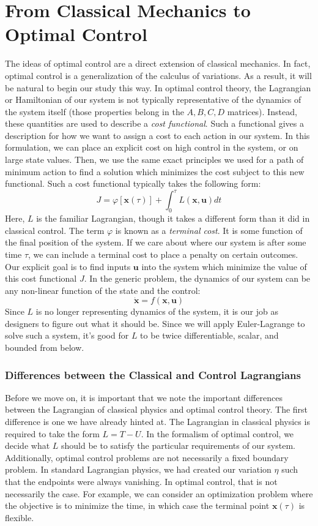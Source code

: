 \section{From Classical Mechanics to Optimal Control}
The ideas of optimal control are a direct extension of classical mechanics. In fact, optimal control is a generalization of the calculus of variations. As a result, it will be natural to begin our study this way. In optimal control theory, the \gls{Lagrangian} or \gls{Hamiltonian} of our system is not typically representative of the dynamics of the system itself (those properties belong in the $A,B,C,D$ matrices). Instead, these quantities are used to describe a \textit{cost functional}. Such a functional gives a description for how we want to assign a cost to each action in our system. In this formulation, we can place an explicit cost on high control in the system, or on large state values. Then, we use the same exact principles we used for a path of minimum action to find a solution which minimizes the cost subject to this new functional. Such a cost functional typically takes the following form:
$$J=\varphi[\bm{x}(\tau)]+\int_0^\tau L(\bm{x},\bm{u})dt$$
Here, $L$ is the familiar \gls{Lagrangian}, though it takes a different form than it did in classical control. The term $\varphi$ is known as a \textit{terminal cost}. It is some function of the final position of the system. If we care about where our system is after some time $\tau$, we can include a terminal cost to place a penalty on certain outcomes. Our explicit goal is to find inputs $\bm{u}$ into the system which minimize the value of this cost functional $J$. In the generic problem, the dynamics of our system can be any non-linear function of the state and the control:
$$\bm{\dot{x}}=f(\bm{x},\bm{u})$$
Since $L$ is no longer representing dynamics of the system, it is our job as designers to figure out what it should be. Since we will apply Euler-Lagrange to solve such a system, it's good for $L$ to be twice differentiable, scalar, and bounded from below.

\subsubsection{Differences between the Classical and Control Lagrangians}
Before we move on, it is important that we note the important differences between the \gls{Lagrangian} of classical physics and optimal control theory. The first difference is one we have already hinted at. The \gls{Lagrangian} in classical physics is required to take the form $L=T-U$. In the formalism of optimal control, we decide what $L$ should be to satisfy the particular requirements of our system. Additionally, optimal control problems are not necessarily a fixed boundary problem. In standard \gls{Lagrangian} physics, we had created our variation $\eta$ such that the endpoints were always vanishing. In optimal control, that is not necessarily the case. For example, we can consider an optimization problem where the objective is to minimize the time, in which case the terminal point $\bm{x}(\tau)$ is flexible.

